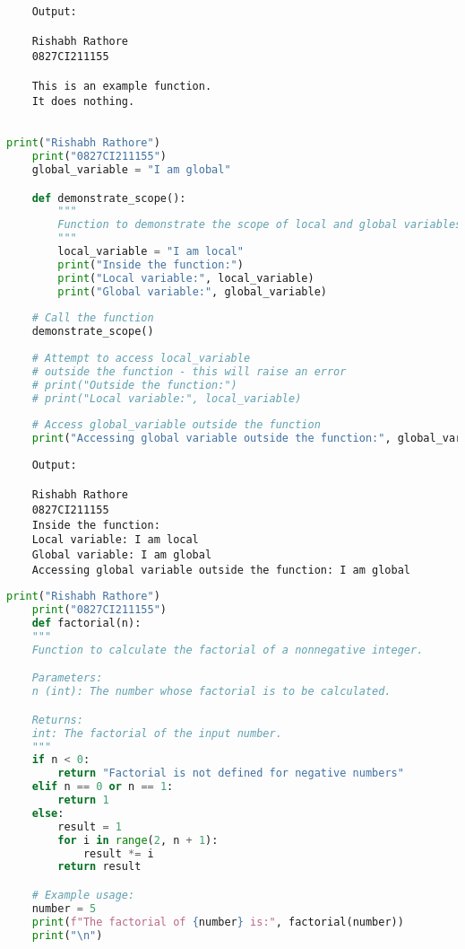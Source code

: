 \documentclass{report}
\begin{document}
\begin{verbatim}
	Output:

	Rishabh Rathore
	0827CI211155

    This is an example function.
    It does nothing.


\end{verbatim}


\newpage


\sol 
\begin{lstlisting}[language=Python]
	print("Rishabh Rathore")
	print("0827CI211155")
	global_variable = "I am global"

	def demonstrate_scope():
		"""
		Function to demonstrate the scope of local and global variables.
		"""
		local_variable = "I am local"
		print("Inside the function:")
		print("Local variable:", local_variable)
		print("Global variable:", global_variable)
	
	# Call the function
	demonstrate_scope()
	
	# Attempt to access local_variable 
	# outside the function - this will raise an error
	# print("Outside the function:")
	# print("Local variable:", local_variable)
	
	# Access global_variable outside the function
	print("Accessing global variable outside the function:", global_variable)


\end{lstlisting}

\begin{verbatim}
	Output:

	Rishabh Rathore
	0827CI211155
	Inside the function:
	Local variable: I am local
	Global variable: I am global
	Accessing global variable outside the function: I am global

\end{verbatim}


\newpage


\sol 
\begin{lstlisting}[language=Python]
	print("Rishabh Rathore")
	print("0827CI211155")
	def factorial(n):
    """
    Function to calculate the factorial of a nonnegative integer.

    Parameters:
    n (int): The number whose factorial is to be calculated.

    Returns:
    int: The factorial of the input number.
    """
    if n < 0:
        return "Factorial is not defined for negative numbers"
    elif n == 0 or n == 1:
        return 1
    else:
        result = 1
        for i in range(2, n + 1):
            result *= i
        return result

	# Example usage:
	number = 5
	print(f"The factorial of {number} is:", factorial(number))
	print("\n")
  

\end{lstlisting}
\end{document}
